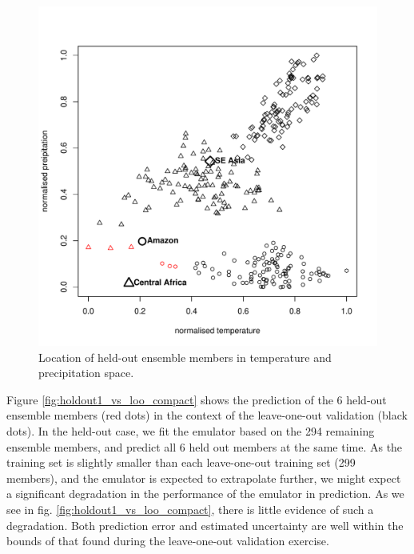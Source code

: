 \documentclass[gmd, manuscript]{copernicus} %
\begin{document}
\begin{figure}[t]
\includegraphics[width=12cm]{../graphics/holdout1_location.pdf}
\caption{Location of held-out ensemble members in temperature and precipitation space.}
\label{fig:holdout1_location}
\end{figure}


Figure \ref{fig:holdout1_vs_loo_compact} shows the prediction of the 6 held-out ensemble members (red dots) in the context of the leave-one-out validation (black dots). In the held-out case, we fit the emulator based on the 294 remaining ensemble members, and predict all 6 held out members at the same time. As the training set is slightly smaller than each leave-one-out training set (299 members), and the emulator is expected to extrapolate further, we might expect a significant degradation in the performance of the emulator in prediction. As we see in fig. \ref{fig:holdout1_vs_loo_compact}, there is little evidence of such a degradation. Both prediction error and estimated uncertainty are well within the bounds of that found during the leave-one-out validation exercise.
\end{document}
